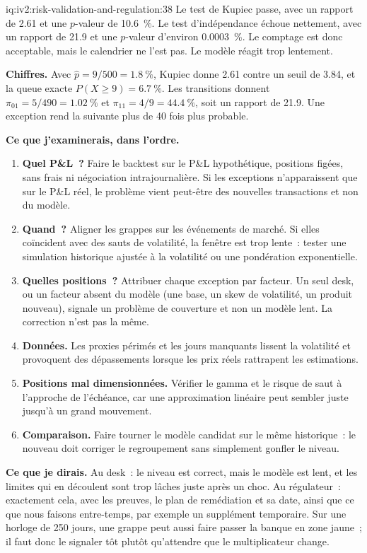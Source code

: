 \begin{solution}{iq:iv2:risk-validation-and-regulation:38}
Le test de Kupiec passe, avec un rapport de 2.61 et une $p$-valeur de 10.6~\%. Le test d'indépendance échoue nettement, avec un rapport de 21.9 et une $p$-valeur d'environ 0.0003~\%. Le comptage est donc acceptable, mais le calendrier ne l'est pas. Le modèle réagit trop lentement.

\textbf{Chiffres.} Avec $\hat p = 9/500 = 1.8~\%$, Kupiec donne 2.61 contre un seuil de 3.84, et la queue exacte $P(X \ge 9) = 6.7~\%$. Les transitions donnent $\pi_{01} = 5/490 = 1.02~\%$ et $\pi_{11} = 4/9 = 44.4~\%$, soit un rapport de 21.9. Une exception rend la suivante plus de 40 fois plus probable.

\textbf{Ce que j'examinerais, dans l'ordre.}
\begin{enumerate}
\item \textbf{Quel P\&L~?} Faire le backtest sur le P\&L hypothétique, positions figées, sans frais ni négociation intrajournalière. Si les exceptions n'apparaissent que sur le P\&L réel, le problème vient peut-être des nouvelles transactions et non du modèle.
\item \textbf{Quand~?} Aligner les grappes sur les événements de marché. Si elles coïncident avec des sauts de volatilité, la fenêtre est trop lente~: tester une simulation historique ajustée à la volatilité ou une pondération exponentielle.
\item \textbf{Quelles positions~?} Attribuer chaque exception par facteur. Un seul desk, ou un facteur absent du modèle (une base, un skew de volatilité, un produit nouveau), signale un problème de couverture et non un modèle lent. La correction n'est pas la même.
\item \textbf{Données.} Les proxies périmés et les jours manquants lissent la volatilité et provoquent des dépassements lorsque les prix réels rattrapent les estimations.
\item \textbf{Positions mal dimensionnées.} Vérifier le gamma et le risque de saut à l'approche de l'échéance, car une approximation linéaire peut sembler juste jusqu'à un grand mouvement.
\item \textbf{Comparaison.} Faire tourner le modèle candidat sur le même historique~: le nouveau doit corriger le regroupement sans simplement gonfler le niveau.
\end{enumerate}

\textbf{Ce que je dirais.} Au desk~: le niveau est correct, mais le modèle est lent, et les limites qui en découlent sont trop lâches juste après un choc. Au régulateur~: exactement cela, avec les preuves, le plan de remédiation et sa date, ainsi que ce que nous faisons entre-temps, par exemple un supplément temporaire. Sur une horloge de 250 jours, une grappe peut aussi faire passer la banque en zone jaune~; il faut donc le signaler tôt plutôt qu'attendre que le multiplicateur change.


\end{solution}
